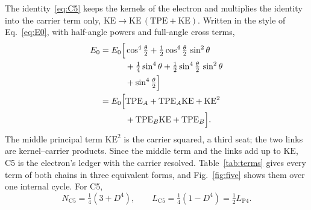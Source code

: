 \documentclass[%
 reprint, amsmath,amssymb, aps, prb, ]{revtex4-2}
\numberwithin{equation}{section}
\begin{document}
The identity~\eqref{eq:C5} keeps the kernels of the electron and multiplies the identity into the carrier term only, $\mathrm{KE}\to\mathrm{KE}\,(\mathrm{TPE}+\mathrm{KE})$. Written in the style of Eq.~\eqref{eq:E0}, with half-angle powers and full-angle cross terms,
\begin{align}
E_0=E_0\Big[&\cos^4\tfrac{\theta}{2}+\tfrac12\cos^4\tfrac{\theta}{2}\,\sin^2\theta
\notag\\
&+\tfrac14\sin^4\theta+\tfrac12\sin^4\tfrac{\theta}{2}\,\sin^2\theta
\notag\\
&+\sin^4\tfrac{\theta}{2}\Big]
\notag\\
=E_0\Big[&\mathrm{TPE}_A+\mathrm{TPE}_A\mathrm{KE}+\mathrm{KE}^2
\notag\\
&+\mathrm{TPE}_B\mathrm{KE}+\mathrm{TPE}_B\Big].
\label{eq:C5full}
\end{align}
The middle principal term $\mathrm{KE}^2$ is the carrier squared, a third seat; the two links are kernel--carrier products. Since the middle term and the links add up to $\mathrm{KE}$, C5 is the electron's ledger with the carrier resolved. Table~\ref{tab:terms} gives every term of both chains in three equivalent forms, and Fig.~\ref{fig:five} shows them over one internal cycle. For C5,
\begin{equation}
N_{\mathrm{C5}}=\tfrac14(3+D^4),\qquad L_{\mathrm{C5}}=\tfrac14(1-D^4)=\tfrac12L_{\mathrm{P4}}.
\label{eq:NLC5}
\end{equation}
\end{document}
